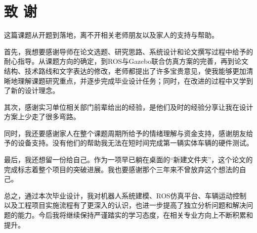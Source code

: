 \section*{致 谢}

这篇课题从开题到落地，离不开相关老师朋友以及家人的支持与帮助。

首先，我想要感谢导师在论文选题、研究思路、系统设计和论文撰写过程中给予的耐心指导。从课题方向的确定，到ROS与Gazebo联合仿真方案的完善，再到论文结构、技术路线和文字表达的修改，老师都提出了许多宝贵意见，使我能够更加清晰地理解课题研究重点，并逐步完成毕业设计任务；同时，在改进的过程中又学到了新的设计理念。

其次，感谢实习单位相关部门前辈给出的经验，是他们及时的经验分享让我在设计方案上少走了很多弯路。

同时，我还要感谢家人在整个课题周期所给予的情绪理解与资金支持，感谢朋友给予的设备支持。没有他们的帮助我无法在短时间完成第一辆实体车辆的硬件测试。

最后，我还想留一份给自己。作为一项早已躺在桌面的``新建文件夹''，这个论文的完成标志着整个项目的突破进展。我也要感谢那个三年来不曾放弃这个想法的自己。

总之，通过本次毕业设计，我对机器人系统建模、ROS仿真平台、车辆运动控制以及工程项目实施流程有了更深入的认识，也进一步提高了独立分析问题和解决问题的能力。今后我将继续保持严谨踏实的学习态度，在相关专业方向上不断积累和提升。